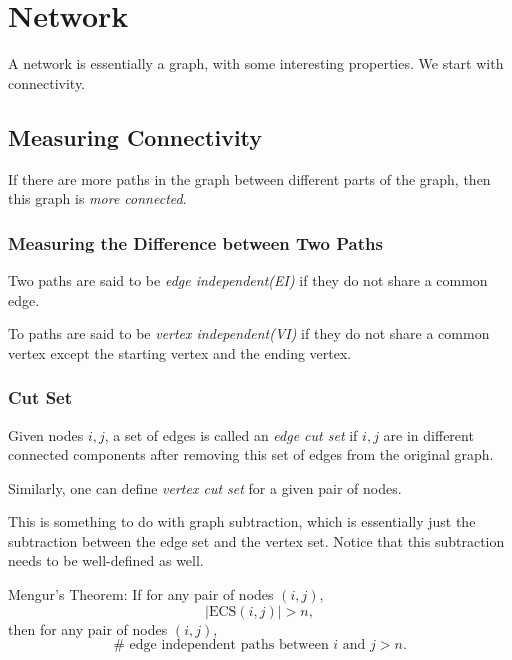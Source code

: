 \section{Network}
A network is essentially a graph, with some interesting properties. We start with connectivity.

\subsection{Measuring Connectivity}
\begin{intuition}
	If there are more paths in the graph between different parts of the graph, then this graph is \emph{more connected}.
\end{intuition}
\subsubsection{Measuring the Difference between Two Paths}
\begin{definition}
	Two paths are said to be \emph{edge independent(EI)} if they do not share a common edge.
\end{definition}

\begin{definition}
	To paths are said to be \emph{vertex independent(VI)} if they do not share a common vertex except the starting vertex and the ending vertex.
\end{definition}

\subsubsection{Cut Set}
\begin{definition}
	Given nodes \(i, j\), a set of edges is called an \emph{edge cut set} if \(i, j\) are in different connected components after removing this set of edges from the original
	graph.
\end{definition}
Similarly, one can define \emph{vertex cut set} for a given pair of nodes.

\begin{remark}
	This is something to do with graph subtraction, which is essentially just the subtraction between the edge set and the vertex set. Notice that this subtraction needs to be
	well-defined as well.
\end{remark}

\begin{theorem}
	Mengur's Theorem: If for any pair of nodes \((i, j)\),
	\[
		\left\vert \mathrm{ECS}(i, j) \right\vert > n,
	\]
	then for any pair of nodes \((i, j)\),
	\[
		\# \text{ edge independent paths between }i \text{ and }j > n.
	\]
\end{theorem}

